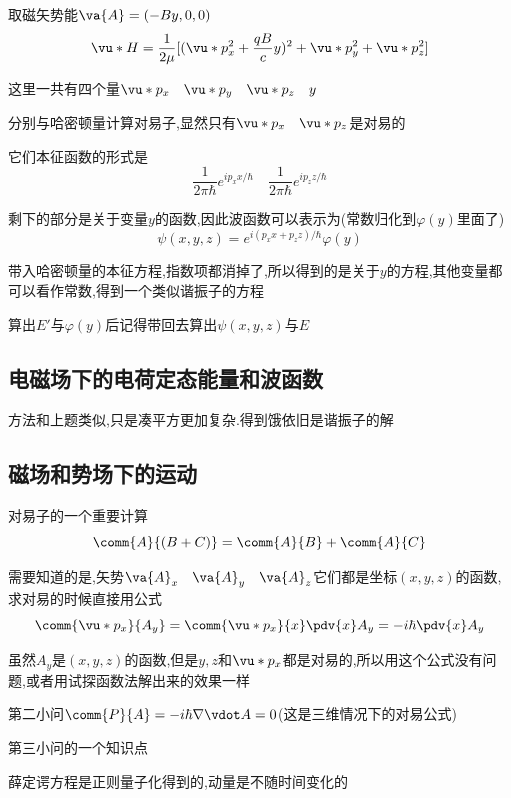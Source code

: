             取磁矢势能$\va{A} = (-By,0,0)$
            $$ \vu*{H} = \frac{1}{2\mu} [(\vu*{p}_{x}^{2} + \frac{qB}{c} y)^{2} + \vu*{p}_{y}^{2} + \vu*{p}_{z}^{2} ] $$

            这里一共有四个量$\vu*{p}_{x} \quad \vu*{p}_{y} \quad \vu*{p}_{z} \quad y $

            分别与哈密顿量计算对易子,显然只有$\vu*{p}_{x} \quad \vu*{p}_{z}$是对易的

            它们本征函数的形式是
            $$ \frac{1}{2\pi \hbar} e^{ip_{x}x/\hbar} \quad \frac{1}{2\pi \hbar} e^{ip_{z}z / \hbar} $$

            剩下的部分是关于变量$y$的函数,因此波函数可以表示为(常数归化到$\varphi(y)$里面了)
            $$ \psi(x,y,z) = e^{i(p_{x}x+p_{z}z)/\hbar} \varphi(y) $$

            带入哈密顿量的本征方程,指数项都消掉了,所以得到的是关于$y$的方程,其他变量都可以看作常数,得到一个类似谐振子的方程
            
            算出$E'$与$\varphi(y)$后记得带回去算出$\psi(x,y,z)$与$E$


        \subsection{电磁场下的电荷定态能量和波函数}
            方法和上题类似,只是凑平方更加复杂.得到饿依旧是谐振子的解

        \subsection{磁场和势场下的运动}
            \begin{formal}
                对易子的一个重要计算
                    $$ \comm{A}{(B+C)} = \comm{A}{B} + \comm{A}{C} $$
            \end{formal}
        
            需要知道的是,矢势$\va{A}_{x} \quad \va{A}_{y} \quad \va{A}_{z}$它们都是坐标$(x,y,z)$的函数,求对易的时候直接用公式
            $$ \comm{\vu*{p}_{x}}{A_{y}}  =  \comm{\vu*{p}_{x}}{x} \pdv{x} A_{y} =  - i \hbar \pdv{x} A_{y} $$

            虽然$A_{y}$是$(x,y,z)$的函数,但是$y,z$和$\vu*{p}_{x}$都是对易的,所以用这个公式没有问题,或者用试探函数法解出来的效果一样

            第二小问$\comm{P}{A} = -i\hbar \nabla \vdot A = 0$(这是三维情况下的对易公式)

            第三小问的一个知识点

            \begin{formal}
                薛定谔方程是正则量子化得到的,动量是不随时间变化的
            \end{formal}

